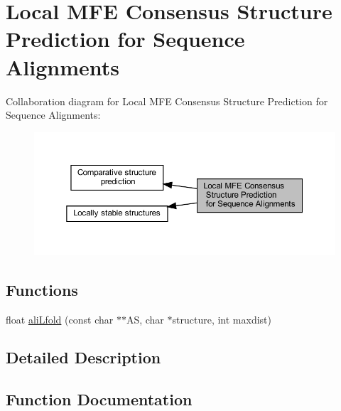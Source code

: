\hypertarget{group__local__consensus__fold}{}\section{Local M\+FE Consensus Structure Prediction for Sequence Alignments}
\label{group__local__consensus__fold}
Collaboration diagram for Local M\+FE Consensus Structure Prediction for Sequence Alignments\+:
\nopagebreak
\begin{figure}[H]
\begin{center}
\leavevmode
\includegraphics[width=350pt]{group__local__consensus__fold}
\end{center}
\end{figure}
\subsection*{Functions}
\begin{DoxyCompactItemize}
\item 
float \hyperlink{group__local__consensus__fold_ga864db0f9c428356d978ad0600aa9a8bc}{ali\+Lfold} (const char $\ast$$\ast$AS, char $\ast$structure, int maxdist)
\end{DoxyCompactItemize}


\subsection{Detailed Description}


\subsection{Function Documentation}
\mbox{\label{group__local__consensus__fold_ga864db0f9c428356d978ad0600aa9a8bc}} 
